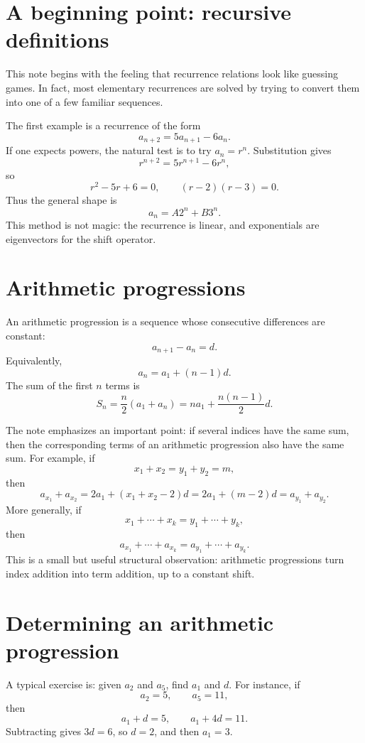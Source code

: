
\section{A beginning point: recursive definitions}

This note begins with the feeling that recurrence relations look like guessing games.  In fact, most elementary recurrences are solved by trying to convert them into one of a few familiar sequences.

The first example is a recurrence of the form
\[
  a_{n+2}=5a_{n+1}-6a_n.
\]
If one expects powers, the natural test is to try \(a_n=r^n\).  Substitution gives
\[
  r^{n+2}=5r^{n+1}-6r^n,
\]
so
\[
  r^2-5r+6=0,\qquad (r-2)(r-3)=0.
\]
Thus the general shape is
\[
  a_n=A2^n+B3^n.
\]
This method is not magic: the recurrence is linear, and exponentials are eigenvectors for the shift operator.

\section{Arithmetic progressions}

An arithmetic progression is a sequence whose consecutive differences are constant:
\[
  a_{n+1}-a_n=d.
\]
Equivalently,
\[
  a_n=a_1+(n-1)d.
\]
The sum of the first \(n\) terms is
\[
  S_n=\frac n2(a_1+a_n)
      =na_1+\frac{n(n-1)}2d.
\]

The note emphasizes an important point: if several indices have the same sum, then the corresponding terms of an arithmetic progression also have the same sum.  For example, if
\[
  x_1+x_2=y_1+y_2=m,
\]
then
\[
  a_{x_1}+a_{x_2}
  =2a_1+(x_1+x_2-2)d
  =2a_1+(m-2)d
  =a_{y_1}+a_{y_2}.
\]
More generally, if
\[
  x_1+\cdots+x_k=y_1+\cdots+y_k,
\]
then
\[
  a_{x_1}+\cdots+a_{x_k}
  =a_{y_1}+\cdots+a_{y_k}.
\]
This is a small but useful structural observation: arithmetic progressions turn index addition into term addition, up to a constant shift.

\section{Determining an arithmetic progression}

A typical exercise is: given \(a_2\) and \(a_5\), find \(a_1\) and \(d\).  For instance, if
\[
  a_2=5,\qquad a_5=11,
\]
then
\[
  a_1+d=5,\qquad a_1+4d=11.
\]
Subtracting gives \(3d=6\), so \(d=2\), and then \(a_1=3\).

